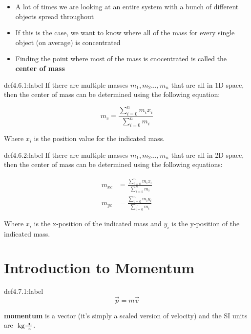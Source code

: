 \begin{itemize}
    \item A lot of times we are looking at an entire system with a bunch of different objects spread throughout
    \item If this is the case, we want to know where all of the mass for every single object (on average) is concentrated
    \item Finding the point where most of the mass is cnocentrated is called the \textbf{center of mass}
\end{itemize}

\begin{definition}{def4.6.1:label}
    If there are multiple masses $m_1,m_2\dots,m_n$ that are all in 1D space, then the center of mass can be determined using the following equation:

    \[
        m_{c} = \frac{\sum_{i=0}^n m_ix_i}{\sum_{i=0}^n m_i}    
    \]

    Where $x_i$ is the position value for the indicated mass.
\end{definition}


\newpage
\begin{definition}{def4.6.2:label}
    If there are multiple masses $m_1,m_2\dots,m_n$ that are all in 2D space, then the center of mass can be determined using the following equations:

    \[
        \begin{aligned}
            m_{xc} &= \frac{\sum_{i=0}^n m_ix_i}{\sum_{i=0}^n m_i}\\
            m_{yc} &= \frac{\sum_{i=0}^n m_iy_i}{\sum_{i=0}^n m_i} 
        \end{aligned}   
    \]

    Where $x_i$ is the x-position of the indicated mass and $y_i$ is the y-position of the indicated mass.
\end{definition}


\section{Introduction to Momentum}

\begin{definition}[Momentum]{def4.7.1:label}
    \[
    \vec p = m \vec v  
    \]

    \textbf{momentum} is a vector (it's simply a scaled version of velocity) and the SI units are $\text{ kg} \frac{\text{ m}}{\text{ s}}$.
\end{definition}

